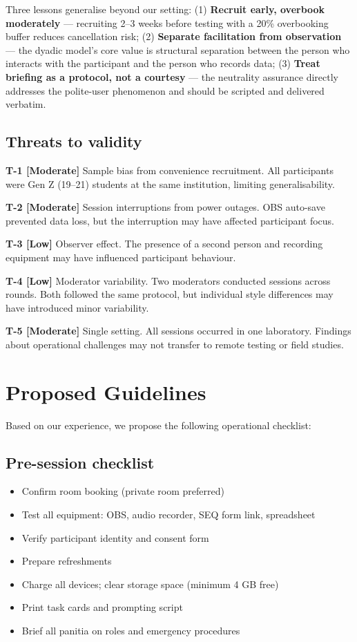 \documentclass[conference]{IEEEtran}
\begin{document}
Three lessons generalise beyond our setting: (1) \textbf{Recruit early, overbook moderately} ---
recruiting 2--3 weeks before testing with a 20\% overbooking buffer reduces cancellation risk; (2)
\textbf{Separate facilitation from observation} --- the dyadic model's core value is structural
separation between the person who interacts with the participant and the person who records data;
(3) \textbf{Treat briefing as a protocol, not a courtesy} --- the neutrality assurance directly
addresses the polite-user phenomenon and should be scripted and delivered verbatim.

\subsection{Threats to validity}
\label{sec:threats}

\textbf{T-1 [Moderate]} Sample bias from convenience recruitment. All participants were Gen Z (19--21)
students at the same institution, limiting generalisability.

\textbf{T-2 [Moderate]} Session interruptions from power outages. OBS auto-save prevented data loss,
but the interruption may have affected participant focus.

\textbf{T-3 [Low]} Observer effect. The presence of a second person and recording equipment may have
influenced participant behaviour.

\textbf{T-4 [Low]} Moderator variability. Two moderators conducted sessions across rounds. Both
followed the same protocol, but individual style differences may have introduced minor variability.

\textbf{T-5 [Moderate]} Single setting. All sessions occurred in one laboratory. Findings about
operational challenges may not transfer to remote testing or field studies.

\section{Proposed Guidelines}

Based on our experience, we propose the following operational checklist:

\subsection{Pre-session checklist}
\begin{itemize}
  \item Confirm room booking (private room preferred)
  \item Test all equipment: OBS, audio recorder, SEQ form link, spreadsheet
  \item Verify participant identity and consent form
  \item Prepare refreshments
  \item Charge all devices; clear storage space (minimum 4 GB free)
  \item Print task cards and prompting script
  \item Brief all panitia on roles and emergency procedures
\end{itemize}
\end{document}
